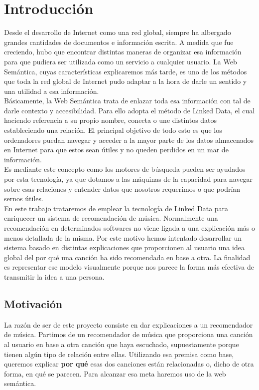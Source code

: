 \chapter{Introducción}
\label{cap:introduccion}

Desde el desarrollo de Internet como una red global, siempre ha albergado grandes cantidades de documentos e información escrita. A medida que fue creciendo, hubo que encontrar distintas maneras de organizar esa información para que pudiera ser utilizada como un servicio a cualquier usuario. La Web Semántica, cuyas características explicaremos más tarde, es uno de los métodos que toda la red global de Internet pudo adaptar a la hora de darle un sentido y una utilidad a esa información.\\

Básicamente, la Web Semántica trata de enlazar toda esa información con tal de darle contexto y accesibilidad. Para ello adopta el método de Linked Data, el cual haciendo referencia a su propio nombre, conecta o une distintos datos estableciendo una relación. El principal objetivo de todo esto es que los ordenadores puedan navegar y acceder a la mayor parte de los datos almacenados en Internet para que estos sean útiles y no queden perdidos en un mar de información.\\

Es mediante este concepto como los motores de búsqueda pueden ser ayudados por esta tecnología, ya que dotamos a las máquinas de la capacidad para navegar sobre esas relaciones y entender datos que nosotros requerimos o que podrían sernos útiles.\\

En este trabajo trataremos de emplear la tecnología de Linked Data para enriquecer un sistema de recomendación de música. Normalmente una recomendación en determinados softwares no viene ligada a una explicación más o menos detallada de la misma. Por este motivo hemos intentado desarrollar un sistema basado en distintas explicaciones que proporcionen al usuario una idea global del por qué una canción ha sido recomendada en base a otra. La finalidad es representar ese modelo visualmente porque nos parece la forma más efectiva de transmitir la idea a una persona.\\

\section{Motivación}

La razón de ser de este proyecto consiste en dar explicaciones a un recomendador de música. Partimos de un recomendador de música que proporciona una canción al usuario en base a otra canción que haya escuchado, supuestamente porque tienen algún tipo de relación entre ellas. Utilizando esa premisa como base, queremos explicar \textbf{por qué} esas dos canciones están relacionadas o, dicho de otra forma, en qué se parecen. Para alcanzar esa meta haremos uso de la web semántica.\\

